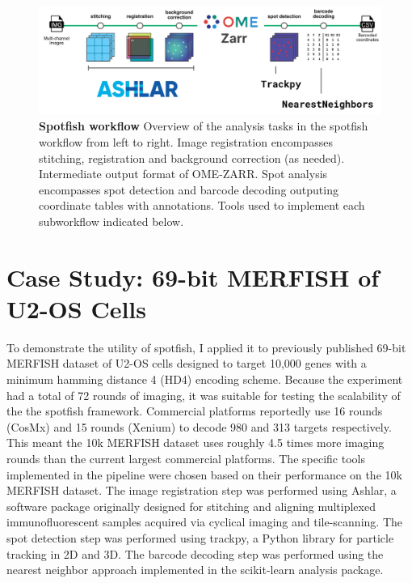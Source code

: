 \begin{figure}[h]
    \centering
    \includegraphics[width=\textwidth]{3_figures-and-files/image processing workflow.jpg}
    \caption[Spotfish workflow]{\textbf{Spotfish workflow} Overview of the analysis tasks in the spotfish workflow from left to right. Image registration encompasses stitching, registration and background correction (as needed). Intermediate output format of OME-ZARR. Spot analysis encompasses spot detection and barcode decoding outputing coordinate tables with annotations. Tools used to implement each subworkflow indicated below.}\label{fig:spotfish workflow}
\end{figure}


\section{Case Study: 69-bit MERFISH of U2-OS Cells}

To demonstrate the utility of spotfish, I applied it to previously published 69-bit MERFISH dataset of U2-OS cells designed to target 10,000 genes with a minimum hamming distance 4 (HD4) encoding scheme\cite{xiaSpatialTranscriptomeProfiling2019}. Because the experiment had a total of 72 rounds of imaging, it was suitable for testing the scalability of the the spotfish framework. Commercial platforms reportedly use 16 rounds (CosMx\cite{heHighplexMultiomicAnalysis2021}) and 15 rounds (Xenium\cite{janesickHighResolutionMapping2022}) to decode 980 and 313 targets respectively. This meant the 10k MERFISH dataset uses roughly 4.5 times more imaging rounds than the current largest commercial platforms. The specific tools implemented in the pipeline were chosen based on their performance on the 10k MERFISH dataset. The image registration step was performed using Ashlar\cite{muhlichStitchingRegisteringHighly2022}, a software package originally designed for stitching and aligning multiplexed immunofluorescent samples acquired via cyclical imaging and tile-scanning. The spot detection step was performed using trackpy\cite{SoftmatterTrackpyV0}, a Python library for particle tracking in 2D and 3D. The barcode decoding step was performed using the nearest neighbor approach implemented in the scikit-learn analysis package\cite{pedregosaScikitlearnMachineLearning2011}.


